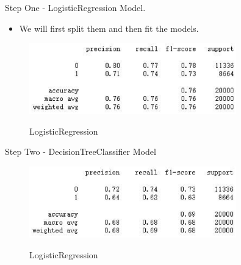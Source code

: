 \documentclass[
size=14pt,
paper=smartboard,  %
mode=present, 		%
display=slides, 	%
style=tuliplab,  	%
pauseslide,
fleqn,leqno]{powerdot}
\begin{document}
	
	\begin{slide}[toc=,bm=]{Step One - LogisticRegression Model.}
		\begin{itemize}
			\item
			\smallskip
			We will first split them and then fit the models.
		\end{itemize}
		\begin{figure}
			\centering
			\includegraphics[width=0.8\textwidth]{figures//fig7.eps}\\
			\caption{LogisticRegression}
		\end{figure}
	\end{slide}
	
	
	\begin{slide}[toc=,bm=]{Step Two - DecisionTreeClassifier Model}
		\begin{figure}
			\centering
			\includegraphics[width=0.8\textwidth]{figures//fig8.eps}\\
			\caption{LogisticRegression}
		\end{figure}
	\end{slide}
	
\end{document}
